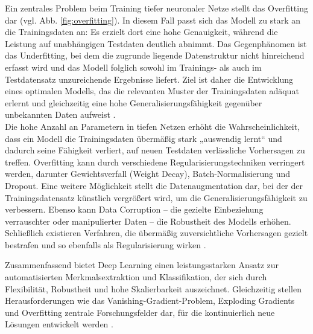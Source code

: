 Ein zentrales Problem beim Training tiefer neuronaler Netze stellt das Overfitting dar (vgl. Abb. \ref{fig:overfitting}). In diesem Fall passt sich das Modell zu stark an die Trainingsdaten an: Es erzielt dort eine hohe Genauigkeit, während die Leistung auf unabhängigen Testdaten deutlich abnimmt. Das Gegenphänomen ist das Underfitting, bei dem die zugrunde liegende Datenstruktur nicht hinreichend erfasst wird und das Modell folglich sowohl im Trainings- als auch im Testdatensatz unzureichende Ergebnisse liefert. Ziel ist daher die Entwicklung eines optimalen Modells, das die relevanten Muster der Trainingsdaten adäquat erlernt und gleichzeitig eine hohe Generalisierungsfähigkeit gegenüber unbekannten Daten aufweist \cite{overfitting_pic}.\\
Die hohe Anzahl an Parametern in tiefen Netzen erhöht die Wahrscheinlichkeit, dass ein Modell die Trainingsdaten übermäßig stark „auswendig lernt“ und dadurch seine Fähigkeit verliert, auf neuen Testdaten verlässliche Vorhersagen zu treffen. Overfitting kann durch verschiedene Regularisierungstechniken verringert werden, darunter Gewichtsverfall (Weight Decay), Batch-Normalisierung und Dropout. Eine weitere Möglichkeit stellt die Datenaugmentation dar, bei der der Trainingsdatensatz künstlich vergrößert wird, um die Generalisierungsfähigkeit zu verbessern. Ebenso kann Data Corruption – die gezielte Einbeziehung verrauschter oder manipulierter Daten – die Robustheit des Modells erhöhen. Schließlich existieren Verfahren, die übermäßig zuversichtliche Vorhersagen gezielt bestrafen und so ebenfalls als Regularisierung wirken \cite{Alzubaidi2021}.

Zusammenfassend bietet Deep Learning einen leistungsstarken Ansatz zur automatisierten Merkmalsextraktion und Klassifikation, der sich durch Flexibilität, Robustheit und hohe Skalierbarkeit auszeichnet. Gleichzeitig stellen Herausforderungen wie das Vanishing-Gradient-Problem, Exploding Gradients und Overfitting zentrale Forschungsfelder dar, für die kontinuierlich neue Lösungen entwickelt werden \cite{Alzubaidi2021}. 





